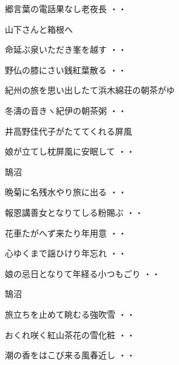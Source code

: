 \begin{shiika}郷言葉の電話果なし老夜長
\hfill{・・}\end{shiika}
\vspace{0.4cm}
山下さんと箱根へ
\begin{shiika}命延ぶ泉いただき峯を越す
\hfill{・・}\end{shiika}
\begin{shiika}野仏の膝にさい銭紅葉散る
\hfill{・・}\end{shiika}
\vspace{0.4cm}
紀州の旅を思い出したて浜木綿荘の朝茶がゆ
\begin{shiika}冬濤の音きヽ紀伊の朝茶粥
\hfill{・・}\end{shiika}
\vspace{0.4cm}
井高野佳代子がたててくれる屏風
\begin{shiika}娘が立てし枕屏風に安眠して
\hfill{・・}\end{shiika}
\vspace{0.4cm}
鵠沼
\begin{shiika}晩菊に名残水やり旅に出る
\hfill{・・}\end{shiika}
\begin{shiika}報恩講善女となりてしる粉賜ぶ
\hfill{・・}\end{shiika}
\begin{shiika}花車たがへず来たり年用意
\hfill{・・}\end{shiika}
\begin{shiika}心ゆくまで謡ひけり年忘れ
\hfill{・・}\end{shiika}
\begin{shiika}娘の忌日となりて年経る小つもごり
\hfill{・・}\end{shiika}
\vspace{0.4cm}
鵠沼
\begin{shiika}旅立ちを止めて眺むる強吹雪
\hfill{・・}\end{shiika}
\begin{shiika}おくれ咲く紅山茶花の雪化粧
\hfill{・・}\end{shiika}
\begin{shiika}潮の香をはこび来る風春近し
\hfill{・・}\end{shiika}
